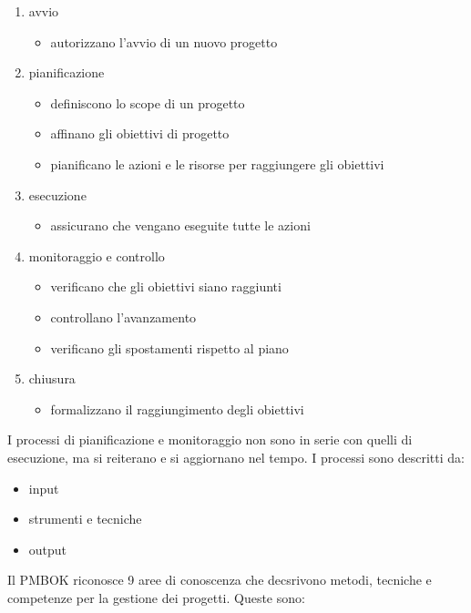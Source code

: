 \documentclass[answers, a4paper, 11pt]{exam}
\begin{document}
\begin{enumerate}
    \item avvio
    \begin{itemize}
        \item autorizzano l'avvio di un nuovo progetto
    \end{itemize}
    \item pianificazione
    \begin{itemize}
        \item definiscono lo scope di un progetto
        \item affinano gli obiettivi di progetto
        \item pianificano le azioni e le risorse per raggiungere gli obiettivi
    \end{itemize} 
    \item esecuzione
    \begin{itemize}
        \item assicurano che vengano eseguite tutte le azioni
    \end{itemize}
    \item monitoraggio e controllo
    \begin{itemize}
        \item verificano che gli obiettivi siano raggiunti
        \item controllano l'avanzamento
        \item verificano gli spostamenti rispetto al piano
    \end{itemize}
    \item chiusura
    \begin{itemize}
        \item formalizzano il raggiungimento degli obiettivi
    \end{itemize}
\end{enumerate}

I processi di pianificazione e monitoraggio non sono in serie con quelli di esecuzione, ma si reiterano e si aggiornano nel tempo. 
I processi sono descritti da:
\begin{itemize}
    \item input
    \item strumenti e tecniche
    \item output
\end{itemize}

Il PMBOK riconosce 9 aree di conoscenza che decsrivono metodi, tecniche e competenze per la gestione dei progetti. Queste sono:
\end{document}
